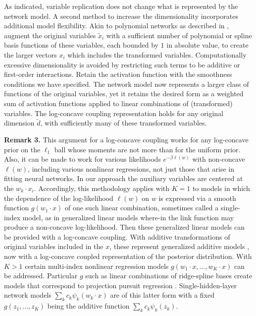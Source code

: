 \documentclass{article}
\numberwithin{equation}{section}
\theoremstyle{Lemma}
\theoremstyle{Corollary}
\theoremstyle{Theorem}
\theoremstyle{Remark}
\newtheorem{remark}{Remark}
\begin{document}
As indicated, variable replication does not change what is represented by the network model. A second method to increase the dimensionality incorporates additional model flexibility. Akin to polynomial networks as described in \cite{cover1965geometrical,cover1968capacity,barron1988statistical}, augment the original variables $\tilde x_i$ with a sufficient number of polynomial or spline basis functions of these variables, each bounded by $1$ in absolute value, to create the larger vectors $x_i$ which includes the transformed variables. Computationally excessive dimensionality is avoided by restricting such terms to be additive or first-order interactions.  Retain the activation function with the smoothness conditions we have specified. The network model now represents a larger class of functions of the original variables, yet it retains the desired form as a weighted sum of activation functions applied to linear combinations of (transformed) variables.  The log-concave coupling representation holds for any original dimension $\tilde d$, with sufficiently many of these transformed variables.

\par\vspace{0.2cm}
\noindent \textbf{Remark 3.}
This argument for a log-concave coupling works for any log-concave prior on the $\ell_1$ ball whose moments are not more than for the uniform prior. Also, it can be made to work for various likelihoods $e^{-\beta \ell(w)}$ with non-concave $\ell(w)$, including various nonlinear regressions, not just those that arise in fitting neural networks.  In our approach the auxiliary variables are centered at the $w_k \cdot x_i$.  Accordingly, this methodology applies with $K=1$ to models in which the dependence of the log-likelihood $\ell(w)$ on $w$ is expressed via a smooth function $g(w_{1} \cdot x)$ of one such linear combination, sometimes called a single-index model, as in generalized linear models \cite{nelder1972generalized, mccullagh1989generalized} where-in the link function may produce a non-concave log-likelihood. Then these generalized linear models can be provided with a log-concave coupling. With additive transformations of original variables included in the $x$, these represent generalized additive models \cite{hastie1986generalized}, now with a log-concave coupled representation of the posterior distribution.  With $K> 1$ certain multi-index nonlinear regression models $g(w_1 \cdot x,...,w_K \cdot x)$ can be addressed. Particular $g$ such as linear combinations of ridge-spline bases create models that correspond to projection pursuit regression \cite{friedman1981projection, huber1985projection}. Single-hidden-layer network models $\sum_k c_k \psi_k(w_k \cdot x)$ are of this latter form with a fixed $g(z_1,...,z_K)$ being the additive function $\sum_k c_k \psi_k(z_k)$.
\end{document}
